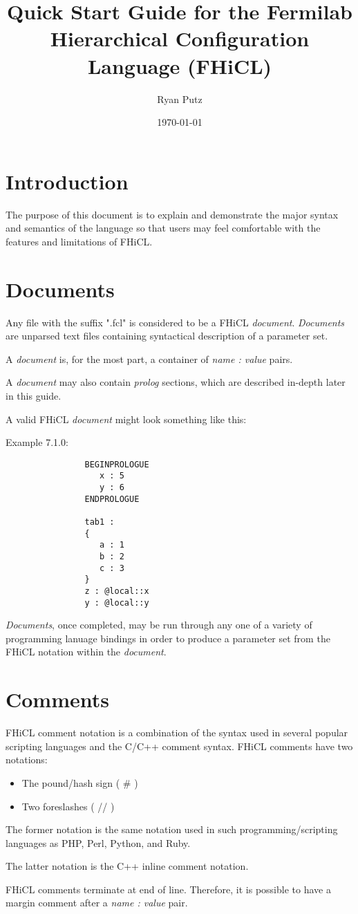 \documentclass{memarticle}
\title{Quick Start Guide for the Fermilab Hierarchical Configuration Language (FHiCL)}
\date{\today}
\author{Ryan Putz}
\begin{document}
\setlength{\parindent}{0in}
\maketitle
\newpage
\tableofcontents
\newpage
\chapter{Introduction}
	The purpose of this document is to explain and demonstrate the major syntax and semantics
	of the language so that users may feel comfortable with the features
	and limitations of FHiCL.

\chapter{Documents}
        Any file with the suffix ".fcl" is considered to be a FHiCL \emph{document}.
        \emph{Documents} are unparsed text files containing syntactical description of a parameter set.
        \par
        A \emph{document} is, for the most part,
        a container of \emph{name : value} pairs.
	\par
	A \emph{document} may also contain \emph{prolog} sections,
	which are described in-depth later in this guide.
        \par
        A valid FHiCL \emph{document} might look something like this:
        \par
        Example 7.1.0:
        \begin{verbatim}
                BEGINPROLOGUE
                   x : 5
                   y : 6
                ENDPROLOGUE
                
                tab1 :
                {
                   a : 1
                   b : 2
                   c : 3
                }
                z : @local::x
                y : @local::y
        \end{verbatim}
        \par
        \emph{Documents}, once completed, may be run through any one of a variety of programming lanuage bindings
        in order to produce a parameter set from the FHiCL notation within the \emph{document}.

\chapter{Comments}
	FHiCL comment notation is a combination of the syntax used in several popular scripting languages and the C/C++ comment syntax.
	FHiCL comments have two notations:
	\begin{itemize}
		\item The pound/hash sign ( \# )
		\item Two foreslashes ( // )
	\end{itemize}
	\par
	The former notation is the same notation used in such programming/scripting languages as
	PHP, Perl, Python, and Ruby.
	\par
	The latter notation is the C++ inline comment notation.
	\par
	FHiCL comments terminate at end of line. 
	Therefore, it is possible to have a margin comment after a \emph{name : value} pair.
\end{document}
